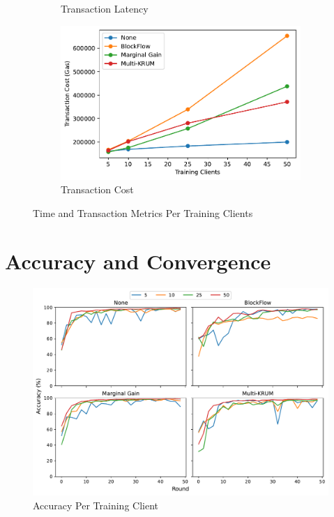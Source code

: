 \begin{figure}[!hb]
\begin{subfigure}[b]{0.49\textwidth}
        \caption{Transaction Latency}
    \end{subfigure}
    \hfill
    \begin{subfigure}[b]{0.49\textwidth}
        \centering
        \includegraphics[width=\textwidth]{graphics/clients/tx_cost.pdf}
        \caption{Transaction Cost}
    \end{subfigure}
    \caption{Time and Transaction Metrics Per Training Clients}
    \label{fig:clients_metrics}
\end{figure}

\section{Accuracy and Convergence}

\begin{figure}[!h]
    \centering
    \includegraphics[width=\textwidth]{graphics/clients/accuracy.pdf}
    \caption{Accuracy Per Training Client}
    \label{fig:accuracy_clients}
\end{figure}


